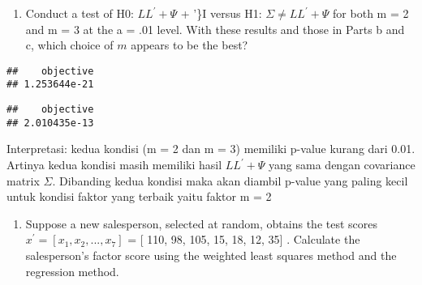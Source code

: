 \documentclass[
]{article}
\newenvironment{Shaded}{\begin{snugshade}}{\end{snugshade}}
\newcommand{\CommentTok}[1]{\textcolor[rgb]{0.56,0.35,0.01}{\textit{#1}}}
\newcommand{\NormalTok}[1]{#1}
\newcommand{\SpecialCharTok}[1]{\textcolor[rgb]{0.00,0.00,0.00}{#1}}
\providecommand{\tightlist}{%
  \setlength{\itemsep}{0pt}\setlength{\parskip}{0pt}}
\begin{document}
\begin{enumerate}
\def\labelenumi{(\alph{enumi})}
\setcounter{enumi}{3}
\tightlist
\item
  Conduct a test of H0: \(LL^{'} + \Psi\) + '\}I versus H1:
  \(\Sigma \ne LL^{'} + \Psi\) for both m = 2 and m = 3 at the a = .01
  level. With these results and those in Parts b and c, which choice of
  \(m\) appears to be the best?
\end{enumerate}

\begin{Shaded}
\end{Shaded}

\begin{verbatim}
##    objective 
## 1.253644e-21
\end{verbatim}

\begin{Shaded}
\end{Shaded}

\begin{verbatim}
##    objective 
## 2.010435e-13
\end{verbatim}

Interpretasi: kedua kondisi (m = 2 dan m = 3) memiliki p-value kurang
dari 0.01. Artinya kedua kondisi masih memiliki hasil \(LL^{'} + \Psi\)
yang sama dengan covariance matrix \(\Sigma\). Dibanding kedua kondisi
maka akan diambil p-value yang paling kecil untuk kondisi faktor yang
terbaik yaitu faktor m = 2

\begin{enumerate}
\def\labelenumi{(\alph{enumi})}
\setcounter{enumi}{4}
\tightlist
\item
  Suppose a new salesperson, selected at random, obtains the test scores
  \(x^{'} = [x_{1}, x_{2},... , x_{7}]\) = {[} 110, 98, 105, 15, 18, 12,
  35{]} . Calculate the salesperson's factor score using the weighted
  least squares method and the regression method.
\end{enumerate}
\end{document}
